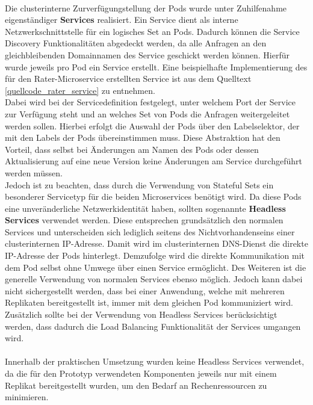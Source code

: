 \\
Die clusterinterne Zurverfügungstellung der Pods wurde unter Zuhilfenahme eigenständiger \textbf{Services} realisiert. Ein Service dient als interne Netzwerkschnittstelle für ein logisches Set an Pods. Dadurch können die Service Discovery Funktionalitäten abgedeckt werden, da alle Anfragen an den gleichbleibenden Domainnamen des Service geschickt werden können. Hierfür wurde jeweils pro Pod ein Service erstellt. Eine beispielhafte Implementierung des für den Rater-Microservice erstellten Service ist aus dem Quelltext \ref{quellcode_rater_service} zu entnehmen. \\
Dabei wird bei der Servicedefinition festgelegt, unter welchem Port der Service zur Verfügung steht und an welches Set von Pods die Anfragen weitergeleitet werden sollen. Hierbei erfolgt die Auswahl der Pods über den Labelselektor, der mit den Labels der Pods übereinstimmen muss. Diese Abstraktion hat den Vorteil, dass selbst bei Änderungen am Namen des Pods oder dessen Aktualisierung auf eine neue Version keine Änderungen am Service durchgeführt werden müssen.\\
Jedoch ist zu beachten, dass durch die Verwendung von Stateful Sets ein besonderer Servicetyp für die beiden Microservices benötigt wird. Da diese Pods eine unveränderliche Netzwerkidentität haben, sollten sogenannte \textbf{Headless Services} verwendet werden. Diese entsprechen grundsätzlich den normalen Services und unterscheiden sich lediglich seitens des Nichtvorhandenseins einer clusterinternen \ac{IP}-Adresse. Damit wird im clusterinternen \ac{DNS}-Dienst die direkte \ac{IP}-Adresse der Pods hinterlegt. Demzufolge wird die direkte Kommunikation mit dem Pod selbst ohne Umwege über einen Service ermöglicht. Des Weiteren ist die generelle Verwendung von normalen Services ebenso möglich. Jedoch kann dabei nicht sichergestellt werden, dass bei einer Anwendung, welche mit mehreren Replikaten bereitgestellt ist, immer mit dem gleichen Pod kommuniziert wird.\\
Zusätzlich sollte bei der Verwendung von Headless Services berücksichtigt werden, dass dadurch die Load Balancing Funktionalität der Services umgangen wird.\autocite[Vgl.][]{KubernetesAuthors.20200115}\\
\\
Innerhalb der praktischen Umsetzung wurden keine Headless Services verwendet, da die für den Prototyp verwendeten Komponenten jeweils nur mit einem Replikat bereitgestellt wurden, um den Bedarf an Rechenressourcen zu minimieren.\\
